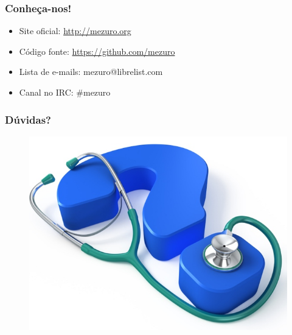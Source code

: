 \documentclass{beamer}
\begin{document}
\begin{frame}
  \frametitle{Conheça-nos!}

  \begin{itemize}
    \item Site oficial: \url{http://mezuro.org}
    \item Código fonte: \url{https://github.com/mezuro}
    \item Lista de e-mails: mezuro@librelist.com
    \item Canal no IRC: \#mezuro
  \end{itemize}
\end{frame}

\begin{frame}
  \frametitle{Dúvidas?}
  \begin{figure}
    \begin{flushleft}
    \begin{center}
    \includegraphics[height=.8\textheight]{images/questions.jpg}
    \end{center}

      \label{fig:questions}
    \end{flushleft}
  \end{figure}
\end{frame}
\end{document}
